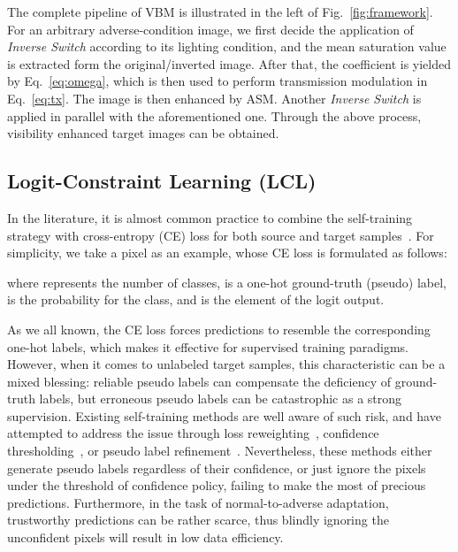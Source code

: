 \documentclass[letterpaper]{article} \usepackage{aaai23}  \usepackage{times}  \usepackage{helvet}  \usepackage{courier}  \usepackage[hyphens]{url}  \usepackage{graphicx} \urlstyle{rm} \def\UrlFont{\rm}  \usepackage{natbib}  \usepackage{caption} \frenchspacing  \setlength{\pdfpagewidth}{8.5in}  \setlength{\pdfpageheight}{11in}  \usepackage{algorithm}
\newcommand{\lossModuleNameTitle}{Logit-Constraint Learning (LCL)}
\begin{document}
The complete pipeline of VBM is illustrated in the left of Fig.~\ref{fig:framework}. For an arbitrary adverse-condition image, we first decide the application of \textit{Inverse Switch} according to its lighting condition, and the mean saturation value  is extracted form the original/inverted image. After that, the coefficient  is yielded by Eq.~\eqref{eq:omega}, which is then used to perform transmission modulation in Eq.~\eqref{eq:tx}. The image is then enhanced by ASM. Another \textit{Inverse Switch} is applied in parallel with the aforementioned one. Through the above process, visibility enhanced target images can be obtained. 

\subsection{\lossModuleNameTitle}
\label{sec:loss}

In the literature, it is almost common practice to combine the self-training strategy with cross-entropy (CE) loss for both source and target samples~\cite{zou2019confidence,zou2018unsupervised,tranheden2021dacs,xie2022sepico}. For simplicity, we take a pixel as an example, whose CE loss is formulated as follows:
\begin{small}
    
\end{small}where  represents the number of classes,  is a one-hot ground-truth (pseudo) label,  is the probability for the  class, and  is the  element of the logit output.

As we all known, the CE loss forces predictions to resemble the corresponding one-hot labels, which makes it effective for supervised training paradigms. However, when it comes to unlabeled target samples, this characteristic can be a mixed blessing: reliable pseudo labels can compensate the deficiency of ground-truth labels, but erroneous pseudo labels can be catastrophic as a strong supervision. Existing self-training methods are well aware of such risk, and have attempted to address the issue through loss reweighting~\cite{olsson2021classmix,tranheden2021dacs}, confidence thresholding~\cite{he2021re}, or pseudo label refinement~\cite{zhang2021prototypical}. Nevertheless, these methods either generate pseudo labels regardless of their confidence, or just ignore the pixels under the threshold of confidence policy, failing to make the most of precious predictions. Furthermore, in the task of normal-to-adverse adaptation, trustworthy predictions can be rather scarce, thus blindly ignoring the unconfident pixels will result in low data efficiency.
\end{document}
